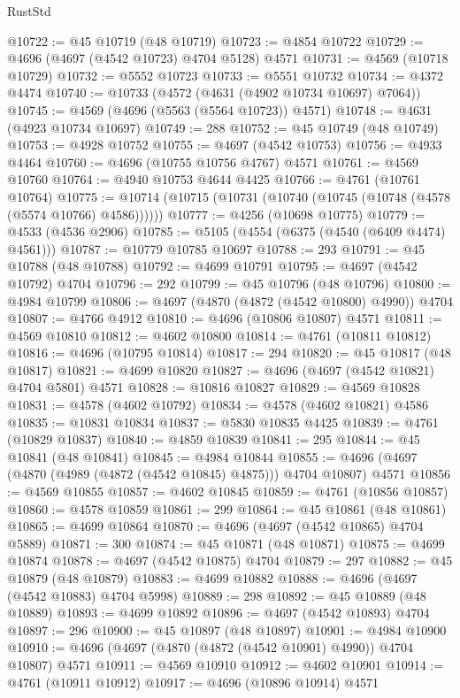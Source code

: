 \begin{lexlean}{RustStd}
\begin{coremodule}
@10722 := @45 @10719 (@48 @10719)
@10723 := @4854 @10722
@10729 := @4696 (@4697 (@4542 @10723) @4704 @5128) @4571
@10731 := @4569 (@10718 @10729)
@10732 := @5552 @10723
@10733 := @5551 @10732
@10734 := @4372 @4474
@10740 := @10733 (@4572 (@4631 (@4902 @10734 @10697) @7064))
@10745 := @4569 (@4696 (@5563 (@5564 @10723)) @4571)
@10748 := @4631 (@4923 @10734 @10697)
@10749 := 288
@10752 := @45 @10749 (@48 @10749)
@10753 := @4928 @10752
@10755 := @4697 (@4542 @10753)
@10756 := @4933 @4464
@10760 := @4696 (@10755 @10756 @4767) @4571
@10761 := @4569 @10760
@10764 := @4940 @10753 @4644 @4425
@10766 := @4761 (@10761 @10764)
@10775 := @10714 (@10715 (@10731 (@10740 (@10745 (@10748 (@4578 (@5574 @10766) @4586))))))
@10777 := @4256 (@10698 @10775)
@10779 := @4533 (@4536 @2906)
@10785 := @5105 (@4554 (@6375 (@4540 (@6409 @4474) @4561)))
@10787 := @10779 @10785 @10697
@10788 := 293
@10791 := @45 @10788 (@48 @10788)
@10792 := @4699 @10791
@10795 := @4697 (@4542 @10792) @4704
@10796 := 292
@10799 := @45 @10796 (@48 @10796)
@10800 := @4984 @10799
@10806 := @4697 (@4870 (@4872 (@4542 @10800) @4990)) @4704
@10807 := @4766 @4912
@10810 := @4696 (@10806 @10807) @4571
@10811 := @4569 @10810
@10812 := @4602 @10800
@10814 := @4761 (@10811 @10812)
@10816 := @4696 (@10795 @10814)
@10817 := 294
@10820 := @45 @10817 (@48 @10817)
@10821 := @4699 @10820
@10827 := @4696 (@4697 (@4542 @10821) @4704 @5801) @4571
@10828 := @10816 @10827
@10829 := @4569 @10828
@10831 := @4578 (@4602 @10792)
@10834 := @4578 (@4602 @10821) @4586
@10835 := @10831 @10834
@10837 := @5830 @10835 @4425
@10839 := @4761 (@10829 @10837)
@10840 := @4859 @10839
@10841 := 295
@10844 := @45 @10841 (@48 @10841)
@10845 := @4984 @10844
@10855 := @4696 (@4697 (@4870 (@4989 (@4872 (@4542 @10845) @4875))) @4704 @10807) @4571
@10856 := @4569 @10855
@10857 := @4602 @10845
@10859 := @4761 (@10856 @10857)
@10860 := @4578 @10859
@10861 := 299
@10864 := @45 @10861 (@48 @10861)
@10865 := @4699 @10864
@10870 := @4696 (@4697 (@4542 @10865) @4704 @5889)
@10871 := 300
@10874 := @45 @10871 (@48 @10871)
@10875 := @4699 @10874
@10878 := @4697 (@4542 @10875) @4704
@10879 := 297
@10882 := @45 @10879 (@48 @10879)
@10883 := @4699 @10882
@10888 := @4696 (@4697 (@4542 @10883) @4704 @5998)
@10889 := 298
@10892 := @45 @10889 (@48 @10889)
@10893 := @4699 @10892
@10896 := @4697 (@4542 @10893) @4704
@10897 := 296
@10900 := @45 @10897 (@48 @10897)
@10901 := @4984 @10900
@10910 := @4696 (@4697 (@4870 (@4872 (@4542 @10901) @4990)) @4704 @10807) @4571
@10911 := @4569 @10910
@10912 := @4602 @10901
@10914 := @4761 (@10911 @10912)
@10917 := @4696 (@10896 @10914) @4571

\end{coremodule}
\end{lexlean}
